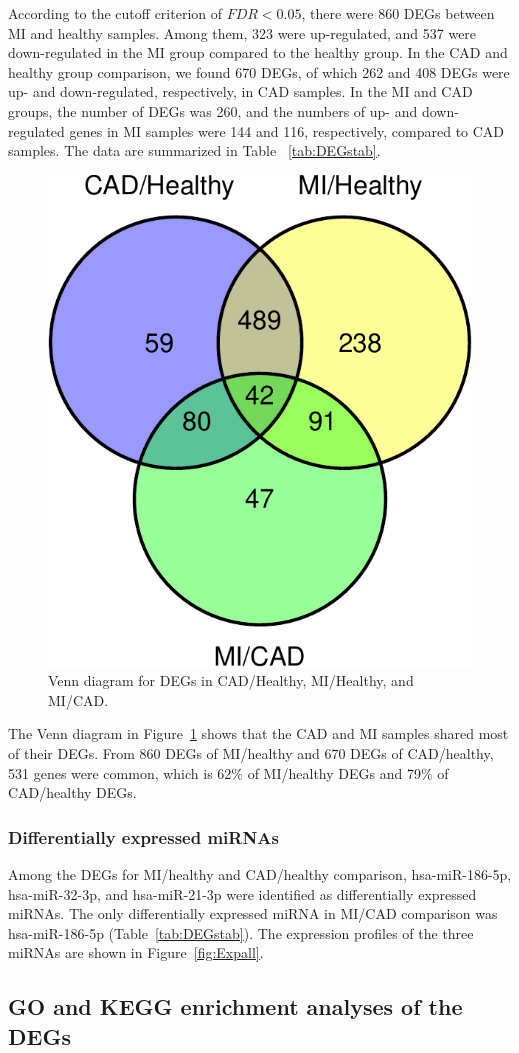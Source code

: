 \documentclass[sn-mathphys,Numbered]{sn-jnl}%
\theoremstyle{thmstyleone}%
\theoremstyle{thmstyletwo}%
\theoremstyle{thmstylethree}%
\begin{document}
According to the cutoff criterion of $FDR < 0.05$, there were 860 DEGs
between MI and healthy samples. Among them, 323 were up-regulated, and
537 were down-regulated in the MI group compared to the healthy group.
In the CAD and healthy group comparison, we found 670 DEGs, of which 262
and 408 DEGs were up- and down-regulated, respectively, in CAD samples.
In the MI and CAD groups, the number of DEGs was 260, and the numbers of
up- and down-regulated genes in MI samples were 144 and 116,
respectively, compared to CAD samples. The data are summarized in Table
~\ref{tab:DEGstab}.

\begin{figure}
\centering 
\includegraphics[width=0.45\linewidth]{venn-1}
\caption{Venn diagram for DEGs in CAD/Healthy, MI/Healthy, and MI/CAD.}\label{fig:venn}
\end{figure}

The Venn diagram in Figure~\ref{fig:venn} shows that the CAD and MI
samples shared most of their DEGs. From 860 DEGs of MI/healthy and 670
DEGs of CAD/healthy, 531 genes were common, which is 62\% of MI/healthy
DEGs and 79\% of CAD/healthy DEGs.

\subsubsection{Differentially expressed miRNAs}\label{mirnas-in-degs}
Among the DEGs for MI/healthy and CAD/healthy comparison, hsa-miR-186-5p, hsa-miR-32-3p, and hsa-miR-21-3p were identified as differentially expressed miRNAs. The only differentially expressed miRNA in MI/CAD comparison was hsa-miR-186-5p (Table~\ref{tab:DEGstab}). The expression profiles of the three
miRNAs are shown in Figure~\ref{fig:Expall}.

\subsection{GO and KEGG enrichment analyses of the
DEGs}\label{go-and-kegg-enrichment-analyses-of-the-degs}
\end{document}
